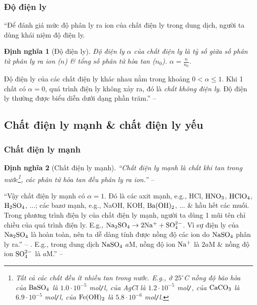 \documentclass[oneside]{book}
\numberwithin{equation}{section}
\newtheorem{dinhnghia}{Định nghĩa}[section]
\begin{document}
\subsubsection{Độ điện ly}
``Để đánh giá mức độ phân ly ra ion của chất điện ly trong dung dịch, người ta dùng khái niệm độ điện ly.

\begin{dinhnghia}[Độ điện ly]
	\emph{Độ điện ly} $\alpha$ của chất điện ly là tỷ số giữa số phân tử phân ly ra ion ($n$) \& tổng số phân tử hòa tan ($n_0$). $\alpha = \frac{n}{n_0}$.
\end{dinhnghia}
Độ điện ly của các chất điện ly khác nhau nằm trong khoảng $0 < \alpha\le 1$. Khi 1 chất có $\alpha = 0$, quá trình điện ly không xảy ra, đó là \textit{chất không điện ly}. Độ điện ly thường được biểu diễn dưới dạng phần trăm.'' -- \cite[p. 8]{SGK_Hoa_Hoc_11_nang_cao}

\subsection{Chất điện ly mạnh \& chất điện ly yếu}

\subsubsection{Chất điện ly mạnh}

\begin{dinhnghia}[Chất điện ly mạnh]
	``\emph{Chất điện ly mạnh} là chất khi tan trong nước\footnote{Tất cả các chất đều ít nhiều tan trong nước. E.g., ở $25^\circ$C nồng độ bão hòa của $\rm BaSO_4$ là $1.0\cdot 10^{-5}$ mol\texttt{/}l, của AgCl là $1.2\cdot 10^{-5}$ mol\texttt{/}, của $\rm CaCO_3$ là $6.9\cdot 10^{-5}$ mol\texttt{/}l, của $\rm Fe(OH)_2$ là $5.8\cdot 10^{-6}$ mol\texttt{/}l.}, các phân tử hòa tan đều phân ly ra ion.'' -- \cite[p. 9]{SGK_Hoa_Hoc_11_nang_cao}
\end{dinhnghia}
``Vậy chất điện ly mạnh có $\alpha = 1$. Đó là các axit mạnh, e.g., HCl, $\rm HNO_3$, $\rm HClO_4$, $\rm H_2SO_4$, $\ldots$; các bazơ mạnh, e.g., NaOH, KOH, $\rm Ba(OH)_2$, $\ldots$ \& hầu hết các muối. Trong phương trình điện ly của chất điện ly mạnh, người ta dùng 1 mũi tên chỉ chiều của quá trình điện ly. E.g., $\rm Na_2SO_4\to 2Na^+ + SO_4^{2-}$. Vì sự điện ly của $\rm Na_2SO_4$ là hoàn toàn, nên ta dễ dàng tính được nồng độ các ion do $\rm NaSO_4$ phân ly ra.'' -- \cite[p. 8]{SGK_Hoa_Hoc_11_nang_cao}. E.g., trong dung dịch $\rm NaSO_4$ $a$M, nồng độ ion $\rm Na^+$ là $2a$M \& nồng độ ion $\rm SO_4^{2-}$ là $a$M.'' -- \cite[p. 9]{SGK_Hoa_Hoc_11_nang_cao}
\end{document}

